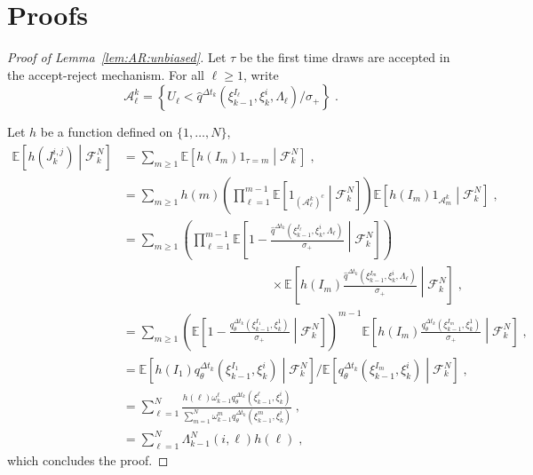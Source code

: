 \documentclass[12pt]{article}
\newcommand{\eqsp}{\;}
\newcommand{\1}{\mathrm{1}}
\begin{document}
\section{Proofs}
\begin{proof}[Proof of Lemma~\ref{lem:AR:unbiased}]
Let $\tau$ be the first time  draws are accepted in the accept-reject mechanism. For all $\ell\ge 1$, write
\[
\mathcal{A}^k_{\ell} = \left\{U_\ell<\widehat{q}^{\Delta t_k}(\xi_{k-1}^{I_\ell},\xi_k^{i},\Lambda_{\ell})/\sigma_+\right\}\eqsp.
\]

Let $h$ be a function defined on $\{1,\ldots,N\}$,
\begin{align*}
\mathbb{E}\left[h(J^{i,j}_k)\middle| \mathcal{F}_k^N\right] & = \sum_{m\ge 1}\mathbb{E}\left[h(I_m)\1_{\tau=m}\middle| \mathcal{F}_k^N\right]\eqsp,\\
& = \sum_{m\ge 1}h(m)\left(\prod_{\ell=1}^{m-1}\mathbb{E}\left[\1_{(\mathcal{A}^k_{\ell})^c}\middle| \mathcal{F}_k^N\right]\right)\mathbb{E}\left[h(I_m)\1_{\mathcal{A}^k_{m}}\middle| \mathcal{F}_k^N\right]\eqsp,\\
& = \sum_{m\ge 1}\left(\prod_{\ell=1}^{m-1}\mathbb{E}\left[1-\frac{\widehat{q}^{\Delta t_k}(\xi_{k-1}^{I_\ell},\xi_k^{i},\Lambda_{\ell})}{\sigma_{+}}\middle| \mathcal{F}_k^N\right]\right)\\
&\hspace{5cm}\times\mathbb{E}\left[h(I_m)\frac{\widehat{q}^{\Delta t_k}(\xi_{k-1}^{I_m},\xi_k^{i},\Lambda_{\ell})}{\sigma_{+}}\middle| \mathcal{F}_k^N\right]\eqsp,\\
& = \sum_{m\ge 1}\left(\mathbb{E}\left[1-\frac{q^{\Delta t_k}_{\theta}(\xi_{k-1}^{I_1},\xi_k^{1})}{\sigma_{+}}\middle| \mathcal{F}_k^N\right]\right)^{m-1}\mathbb{E}\left[h(I_m)\frac{q^{\Delta t_k}_{\theta}(\xi_{k-1}^{I_m},\xi_k^{1})}{\sigma_{+}}\middle| \mathcal{F}_k^N\right]\eqsp,\\
& = \mathbb{E}\left[h(I_1)q^{\Delta t_k}_{\theta}(\xi_{k-1}^{I_1},\xi_k^{i})\middle| \mathcal{F}_k^N\right]/\mathbb{E}\left[q^{\Delta t_k}_{\theta}(\xi_{k-1}^{I_m},\xi_k^{i})\middle| \mathcal{F}_k^N\right]\eqsp,\\
& = \sum_{\ell=1}^N \frac{h(\ell)\omega_{k-1}^{\ell}q^{\Delta t_k}_{\theta}(\xi_{k-1}^{\ell},\xi_k^{i})}{\sum_{m=1}^N\omega_{k-1}^{m}q^{\Delta t_k}_{\theta}(\xi_{k-1}^{m},\xi_k^{i})}\eqsp,\\
&= \sum_{\ell=1}^N \Lambda_{k-1}^N(i,\ell)h(\ell) \eqsp,
\end{align*}
which concludes the proof.
\end{proof}
\end{document}
